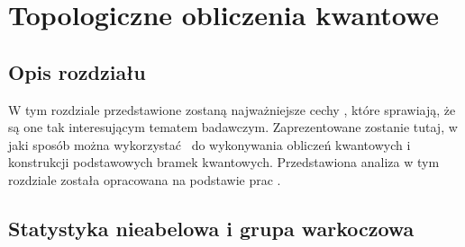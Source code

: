 \chapter{Topologiczne obliczenia kwantowe}\label{chap:topologicalQuantumComputing}

\section*{Opis rozdziału}

W tym rozdziale przedstawione zostaną najważniejsze cechy \MZM, które sprawiają, że są one tak interesującym tematem badawczym.
Zaprezentowane zostanie tutaj, w jaki sposób można wykorzystać \MZM\ do wykonywania obliczeń kwantowych i konstrukcji podstawowych bramek kwantowych.
Przedstawiona analiza w tym rozdziale została opracowana na podstawie prac
\cite{stanescu.2016,leijnse.flensberg.2012,sarma.freedman.2015,nayak.simon.2008,ivanov.2001,lahtinen.pachos.2017,field.simula.2018}.

\section{Statystyka nieabelowa i grupa warkoczowa}\label{sec:nonabelianStatistics}

